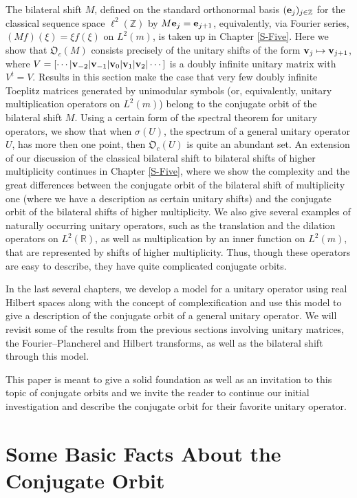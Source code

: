 \documentclass{dis}
\theoremstyle{plain}
\theoremstyle{definition}
\def\R{\mathbb{R}}
\def\Z{\mathbb{Z}}
\renewcommand{\vec}[1]{{\bf #1}}
\newcommand{\0}{{\color{lightgray}0}}
\begin{document}
 
  The bilateral shift $M$, defined on the standard orthonormal basis $(\vec{e}_j)_{j \in \Z}$ for the classical sequence space $\ell^2(\Z)$ by $M \vec{e}_{j} = \vec{e}_{j + 1}$,  equivalently, via Fourier series, $(M f)(\xi) = \xi f(\xi)$ on $L^2(m)$, is taken up in Chapter \ref{S-Five}. Here we show that $\mathfrak{O}_c(M)$ consists precisely of the unitary shifts of the form $\vec{v}_{j} \mapsto \vec{v}_{j + 1}$, where $V = [\cdots| \vec{v}_{-2}|\vec{v}_{-1}|\vec{v}_{0}| \vec{v}_{1}|\vec{v}_{2}|\cdots]$ is a doubly infinite unitary matrix with $V^{t} = V$. Results in this section make the case that very few doubly infinite Toeplitz matrices generated by unimodular symbols (or, equivalently,  unitary multiplication operators on $L^2(m)$) belong to the conjugate orbit of the bilateral shift $M$. Using  a certain form of the spectral theorem for unitary operators, we show that when $\sigma(U)$, the spectrum of a general unitary operator $U$,  has  more then one point, then $\mathfrak{O}_c(U)$ is quite an abundant set. An extension of our discussion of the classical bilateral shift to  bilateral shifts of higher multiplicity continues in Chapter \ref{S-Five}, where we show the complexity and the great differences between the conjugate orbit of the bilateral shift of multiplicity one (where we have a description as certain unitary shifts) and the conjugate orbit of the bilateral shifts of higher multiplicity. We also give several examples of naturally occurring unitary operators, such as the translation and the dilation operators on  $L^2(\R)$, as well as multiplication by an inner function on $L^2(m)$, that are represented by shifts of higher multiplicity. Thus, though these operators are easy to describe, they have quite complicated conjugate orbits. 

In the last several chapters, we develop a model for a unitary operator using real Hilbert spaces along with the concept of complexification and use this model to give a description of the conjugate orbit of a general unitary operator. We will revisit some of the results from the previous sections involving unitary matrices, the Fourier--Plancherel and Hilbert transforms, as well as  the bilateral shift through this model. 

This paper is meant to give a solid foundation as well as an invitation to this topic of conjugate orbits and we invite the reader to continue our initial investigation and describe the conjugate orbit for their favorite unitary operator. 

\chapter{Some Basic Facts About the Conjugate Orbit}\label{S-One}
\end{document}
